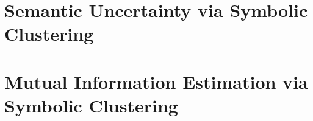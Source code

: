 


\section{Semantic Uncertainty via Symbolic Clustering}
\label{sec:symex}


\section{Mutual Information Estimation via Symbolic Clustering}
\label{sec:mi}



